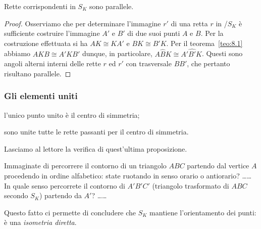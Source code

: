 \begin{teorema}\label{teo:8.2}
Rette corrispondenti in $S_K$ sono parallele.
\end{teorema}

\noindent\begin{minipage}{0.65\textwidth}\parindent15pt
\begin{proof}
Osserviamo che per determinare l'immagine $r'$ di una retta $r$ in 
/$S_K$ è sufficiente costruire l'immagine $A'$ e $B'$ di due suoi 
punti $A$ e $B$. Per la costruzione effettuata si ha $AK\cong KA'$ e 
$BK\cong B'K$. Per il teorema~\ref{teo:8.1} abbiamo $AKB\cong A'KB'$ 
dunque, in particolare, $A\widehat{B}K\cong A'\widehat{B'}K$. Questi 
sono angoli alterni interni delle rette $r$ ed $r'$ con trasversale 
$BB'$, che pertanto risultano parallele.
\end{proof}
\end{minipage}\hfil
\begin{minipage}{0.35\textwidth}
  
\centering
\end{minipage}\vspace{8pt}

\subsubsection{Gli elementi uniti}
\begin{itemize*}
\item l'unico punto unito è il centro di simmetria;
\item sono unite tutte le rette passanti per il centro di simmetria.
\end{itemize*}
Lasciamo al lettore la verifica di quest'ultima 
proposizione.\vspace{8pt}

Immaginate di percorrere il contorno di un triangolo $ABC$ partendo 
dal vertice $A$ procedendo in ordine alfabetico: state ruotando in 
senso orario o antiorario? \ldots\ldots{} In quale senso percorrete 
il contorno di $A'B'C'$ (triangolo trasformato di $ABC$ secondo 
$S_K$) partendo da $A'$? \ldots\ldots{}

Questo fatto ci permette di concludere che $S_K$ mantiene 
l'orientamento dei punti: è una \emph{isometria diretta}.

